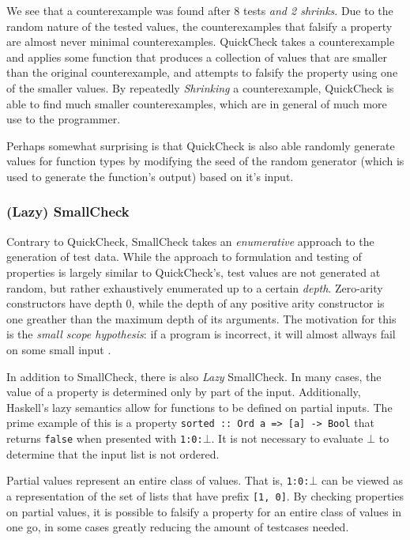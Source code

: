 \documentclass[a4paper,msc,twosized=semi]{uustthesis}
\begin{document}
  We see that a counterexample was found after 8 tests \textit{and 2 shrinks}. Due to 
  the random nature of the tested values, the counterexamples that falsify a property 
  are almost never minimal counterexamples. QuickCheck takes a counterexample and 
  applies some function that produces a collection of values that are smaller than the 
  original counterexample, and attempts to falsify the property using one of the 
  smaller values. By repeatedly \textit{Shrinking} a counterexample, QuickCheck is 
  able to find much smaller counterexamples, which are in general of much more use to 
  the programmer. 

  Perhaps somewhat surprising is that QuickCheck is also able randomly generate values 
  for function types by modifying the seed of the random generator (which is used to 
  generate the function's output) based on it's input. 

\subsubsection{(Lazy) SmallCheck} 

  Contrary to QuickCheck, SmallCheck \cite{runciman2008smallcheck} takes an \textit
  {enumerative} approach to the generation of test data. While the approach to 
  formulation and testing of properties is largely similar to QuickCheck's, test 
  values are not generated at random, but rather exhaustively enumerated up to a 
  certain \textit{depth}. Zero-arity constructors have depth $0$, while the depth of 
  any positive arity constructor is one greather than the maximum depth of its 
  arguments.  The motivation for this is the \textit{small scope hypothesis}: if a 
  program is incorrect, it will almost allways fail on some small input \cite
  {andoni2003evaluating}. 

  In addition to SmallCheck, there is also \textit{Lazy} SmallCheck. In many cases, 
  the value of a property is determined only by part of the input. Additionally, 
  Haskell's lazy semantics allow for functions to be defined on partial inputs. The 
  prime example of this is a property \texttt{sorted :: Ord a => [a] -> Bool} that 
  returns \texttt{false} when presented with \texttt{1:0:$\bot$}. It is not necessary 
  to evaluate $\bot$ to determine that the input list is not ordered. 

  Partial values represent an entire class of values. That is, \texttt{1:0:$\bot$} can 
  be viewed as a representation of the set of lists that have prefix \texttt{[1, 0]}. 
  By checking properties on partial values, it is possible to falsify a property for 
  an entire class of values in one go, in some cases greatly reducing the amount of 
  testcases needed. 
\end{document}
